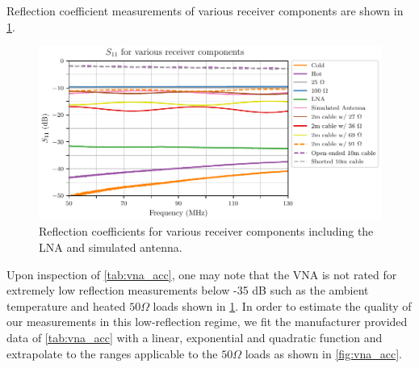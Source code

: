 Reflection coefficient measurements of various receiver components are shown in \cref{fig:s11_meas}. 
\begin{figure}
    \centering
    \includegraphics[width=\columnwidth]{s11_meas}
    \caption{Reflection coefficients for various receiver components including the LNA and simulated antenna.}
    \label{fig:s11_meas}
\end{figure}
Upon inspection of \cref{tab:vna_acc}, one may note that the VNA is not rated for extremely low reflection measurements below -35 dB such as the ambient temperature and heated $50\Omega$ loads shown in \cref{fig:s11_meas}. In order to estimate the quality of our measurements in this low-reflection regime, we fit the manufacturer provided data of \cref{tab:vna_acc} with a linear, exponential and quadratic function and extrapolate to the ranges applicable to the $50 \Omega$ loads as shown in \cref{fig:vna_acc}.
